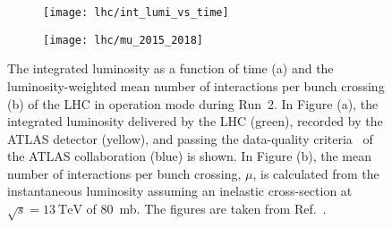 
\begin{figure}[htbp]
  \centering

  \begin{subfigure}{0.47\textwidth}
    \texttt{[image: lhc/int\_lumi\_vs\_time]}
    \subcaption{}%
    \label{fig:atlas_int_lumi_vs_time}
  \end{subfigure}\hspace*{0.02\textwidth}%
  \begin{subfigure}{0.47\textwidth}
    \texttt{[image: lhc/mu\_2015\_2018]}
    \subcaption{}%
    \label{fig:atlas_mu}
  \end{subfigure}

  \caption{The integrated luminosity as a function of time (a) and the
    luminosity-weighted mean number of interactions per bunch crossing (b) of
    the LHC in \pp operation mode during Run~2. In Figure (a), the integrated
    luminosity delivered by the LHC (green), recorded by the ATLAS detector
    (yellow), and passing the data-quality criteria~\cite{DAPR-2018-01} of the
    ATLAS collaboration (blue) is shown. In Figure (b), the mean number of
    interactions per bunch crossing, $\mu$, is calculated from the instantaneous
    luminosity assuming an inelastic \pp cross-section at
    $\sqrt{s} = \SI{13}{\TeV}$ of \SI{80}{\milli\barn}. The figures are taken
    from Ref.~\cite{atlas_luminosity_summary_plots}.}%
  \label{fig:lumi_and_pu}
\end{figure}

